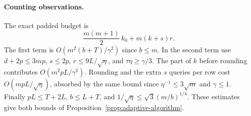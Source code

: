 \paragraph{Counting observations.}
The exact padded budget is
\[
 \frac{m(m+1)}2\,k_0 + m(k+s)r .
\]
The first term is \(O(m^2(b+T)/\gamma^2)\) since \(b\le m\). In the second term use \(d+2p\le3mp\), \(s\le2p\), \(r\le 9L/\sqrt\eta\), and \(\tau\eta\ge\gamma/3\). The part of \(k\) before rounding contributes \(O(m^2pL/\gamma^2)\). Rounding and the extra \(s\) queries per row cost \(O(mpL/\sqrt\eta)\), absorbed by the same bound since \(\eta^{-1}\le3\sqrt m\) and \(\gamma\le1\). Finally \(pL\le T+2L\), \(b\le L+T\), and \(1/\sqrt\eta\le\sqrt3(m/b)^{1/4}\). These estimates give both bounds of Proposition~\ref{prop:adaptive-algorithm}.
